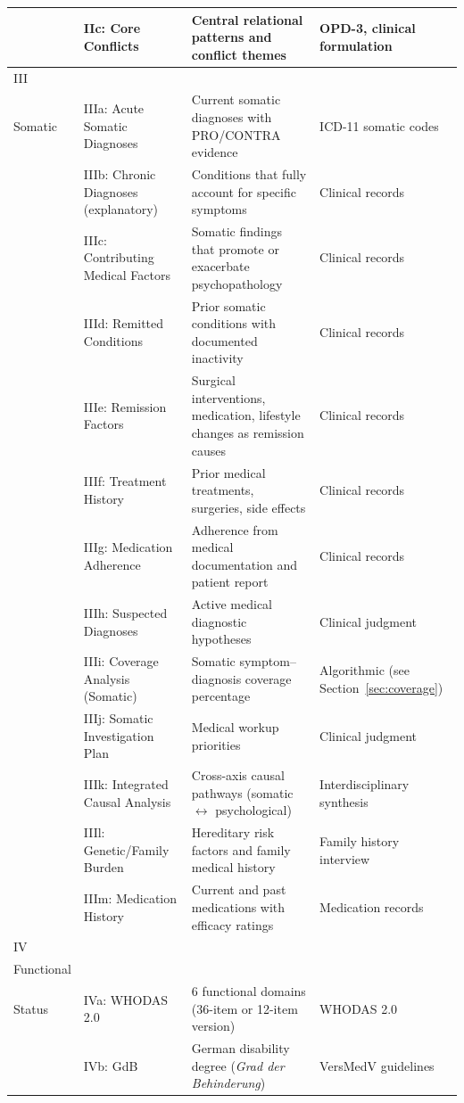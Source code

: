 \documentclass[11pt,a4paper]{article}
\begin{document}
\begin{longtable}{@{}L{1.8cm}L{2.4cm}L{5.0cm}L{4.0cm}@{}}
 & IIc: Core Conflicts & Central relational patterns and conflict themes & OPD-3, clinical formulation \\
\midrule
III\\Somatic & IIIa: Acute Somatic Diagnoses & Current somatic diagnoses with PRO/CONTRA evidence & ICD-11 somatic codes \\
 & IIIb: Chronic Diagnoses (explanatory) & Conditions that fully account for specific symptoms & Clinical records \\
 & IIIc: Contributing Medical Factors & Somatic findings that promote or exacerbate psychopathology & Clinical records \\
 & IIId: Remitted Conditions & Prior somatic conditions with documented inactivity & Clinical records \\
 & IIIe: Remission Factors & Surgical interventions, medication, lifestyle changes as remission causes & Clinical records \\
 & IIIf: Treatment History & Prior medical treatments, surgeries, side effects & Clinical records \\
 & IIIg: Medication Adherence & Adherence from medical documentation and patient report & Clinical records \\
 & IIIh: Suspected Diagnoses & Active medical diagnostic hypotheses & Clinical judgment \\
 & IIIi: Coverage Analysis (Somatic) & Somatic symptom--diagnosis coverage percentage & Algorithmic (see Section~\ref{sec:coverage}) \\
 & IIIj: Somatic Investigation Plan & Medical workup priorities & Clinical judgment \\
 & IIIk: Integrated Causal Analysis & Cross-axis causal pathways (somatic $\leftrightarrow$ psychological) & Interdisciplinary synthesis \\
 & IIIl: Genetic/Family Burden & Hereditary risk factors and family medical history & Family history interview \\
 & IIIm: Medication History & Current and past medications with efficacy ratings & Medication records \\
\midrule
IV\\Functional\\Status & IVa: WHODAS 2.0 & 6 functional domains (36-item or 12-item version) & WHODAS 2.0 \\
 & IVb: GdB & German disability degree (\textit{Grad der Behinderung}) & VersMedV guidelines \\

\end{longtable}
\end{document}
